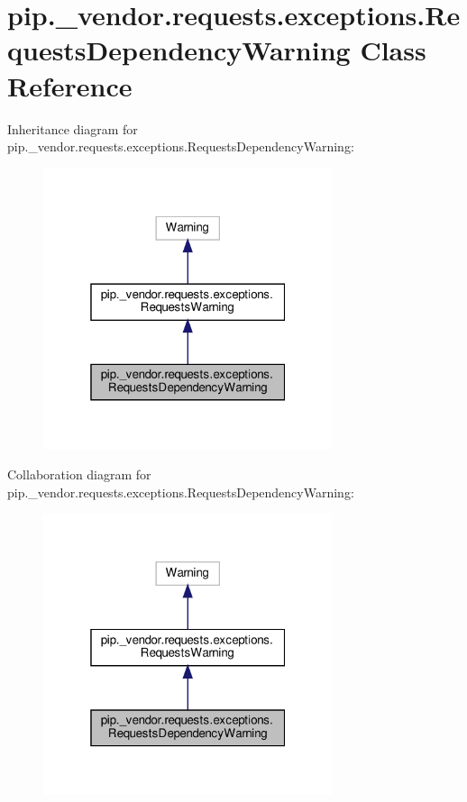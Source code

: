 \hypertarget{classpip_1_1__vendor_1_1requests_1_1exceptions_1_1RequestsDependencyWarning}{}\section{pip.\+\_\+vendor.\+requests.\+exceptions.\+Requests\+Dependency\+Warning Class Reference}
\label{classpip_1_1__vendor_1_1requests_1_1exceptions_1_1RequestsDependencyWarning}


Inheritance diagram for pip.\+\_\+vendor.\+requests.\+exceptions.\+Requests\+Dependency\+Warning\+:
\nopagebreak
\begin{figure}[H]
\begin{center}
\leavevmode
\includegraphics[width=241pt]{classpip_1_1__vendor_1_1requests_1_1exceptions_1_1RequestsDependencyWarning__inherit__graph}
\end{center}
\end{figure}


Collaboration diagram for pip.\+\_\+vendor.\+requests.\+exceptions.\+Requests\+Dependency\+Warning\+:
\nopagebreak
\begin{figure}[H]
\begin{center}
\leavevmode
\includegraphics[width=241pt]{classpip_1_1__vendor_1_1requests_1_1exceptions_1_1RequestsDependencyWarning__coll__graph}
\end{center}
\end{figure}


